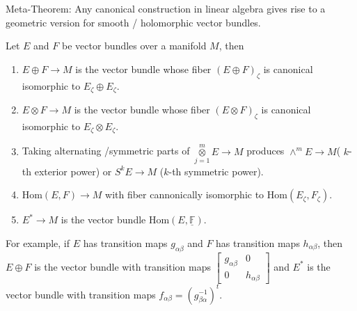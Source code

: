 Meta-Theorem:  Any canonical construction in linear algebra gives rise to a geometric version for smooth / holomorphic vector bundles.
\begin{example}
  Let $E$ and $F$ be vector bundles over a manifold $M$, then
  \begin{enumerate}
    \item $E\oplus F\to M$ is the vector bundle whose fiber $(E\oplus F)_{\zeta }$ is canonical isomorphic to $E_\zeta \oplus E_\zeta $.
    \item $E\otimes F\to M$ is the vector bundle whose fiber $(E\otimes F)_{\zeta}$ is canonical isomorphic to $E_{\zeta }\otimes E_{\zeta}$.
    \item Taking alternating /symmetric parts of $\mathop{\otimes}\limits_{j=1}^{m} E\to M$ produces $\wedge ^{m}E\to M$( $k$-th exterior power) or  $S^{k}E\to M$ ($k$-th symmetric power).
    \item  $\mathrm{Hom}(E,F)\to M$ with fiber cannonically isomorphic to $\mathrm{Hom} (E_\zeta,F_\zeta)$.
    \item $E^* \to M$ is the vector bundle $\mathrm{Hom}(E,\underline{\mathbb{F}})$.
  \end{enumerate}
  For example, if $E$ has transition maps $g_{\alpha \beta }$ and $F$ has transition maps $h_{\alpha \beta}$, then $E\oplus F$ is the vector bundle with transition maps $\begin{bmatrix} g_{\alpha\beta }&0\\0&h_{\alpha\beta } \end{bmatrix} $ and $E^{*}$ is the vector bundle with transition maps $f_{\alpha\beta }=\left( g_{\beta \alpha}^{-1} \right)^t $.
\end{example}

